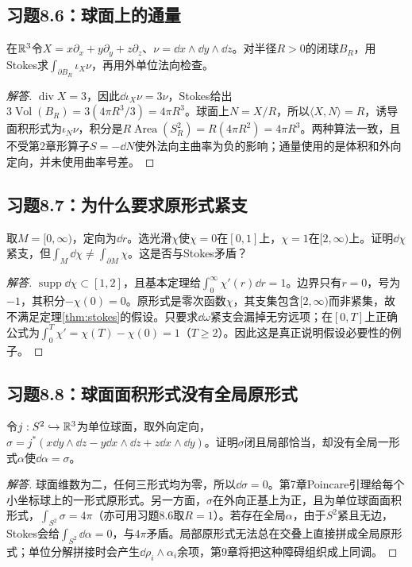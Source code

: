\subsection*{习题8.6：球面上的通量}
在$\mathbb{R}^3$令$X=x\partial_x+y\partial_y+z\partial_z$、$\nu=\dd x\wedge\dd y\wedge\dd z$。对半径$R>0$的闭球$B_R$，用Stokes求$\int_{\partial B_R}\iota_X\nu$，再用外单位法向检查。
\begin{proof}[解答]
$\operatorname{div}X=3$，因此$\dd\iota_X\nu=3\nu$，Stokes给出$3\operatorname{Vol}(B_R)=3(4\pi R^3/3)=4\pi R^3$。球面上$N=X/R$，所以$\langle X,N\rangle=R$，诱导面积形式为$\iota_N\nu$，积分是$R\operatorname{Area}(S_R^2)=R(4\pi R^2)=4\pi R^3$。两种算法一致，且不受第2章形算子$S=-\dd N$使外法向主曲率为负的影响；通量使用的是体积和外向定向，并未使用曲率号差。
\end{proof}

\subsection*{习题8.7：为什么要求原形式紧支}
取$M=[0,\infty)$，定向为$\dd r$。选光滑$\chi$使$\chi=0$在$[0,1]$上，$\chi=1$在$[2,\infty)$上。证明$\dd\chi$紧支，但$\int_M\dd\chi\ne\int_{\partial M}\chi$。这是否与Stokes矛盾？
\begin{proof}[解答]
$\operatorname{supp}\dd\chi\subset[1,2]$，且基本定理给$\int_0^\infty\chi'(r)\dd r=1$。边界只有$r=0$，号为$-1$，其积分$-\chi(0)=0$。原形式是零次函数$\chi$，其支集包含$[2,\infty)$而非紧集，故不满足定理\ref{thm:stokes}的假设。只要求$\dd\omega$紧支会漏掉无穷远项；在$[0,T]$上正确公式为$\int_0^T\chi'=\chi(T)-\chi(0)=1$（$T\geq2$）。因此这是真正说明假设必要性的例子。
\end{proof}

\subsection*{习题8.8：球面面积形式没有全局原形式}
令$j:S^2\hookrightarrow\mathbb{R}^3$为单位球面，取外向定向，$\sigma=j^*(x\dd y\wedge\dd z-y\dd x\wedge\dd z+z\dd x\wedge\dd y)$。证明$\sigma$闭且局部恰当，却没有全局一形式$\alpha$使$\dd\alpha=\sigma$。
\begin{proof}[解答]
球面维数为二，任何三形式均为零，所以$\dd\sigma=0$。第7章Poincare引理给每个小坐标球上的一形式原形式。另一方面，$\sigma$在外向正基上为正，且为单位球面面积形式，$\int_{S^2}\sigma=4\pi$（亦可用习题8.6取$R=1$）。若存在全局$\alpha$，由于$S^2$紧且无边，Stokes会给$\int_{S^2}\dd\alpha=0$，与$4\pi$矛盾。局部原形式无法总在交叠上直接拼成全局原形式；单位分解拼接时会产生$\dd\rho_i\wedge\alpha_i$余项，第9章将把这种障碍组织成上同调。
\end{proof}
